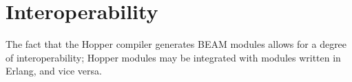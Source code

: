 \section{Interoperability}

The fact that the Hopper compiler generates BEAM modules allows for a degree of interoperability; Hopper modules may be integrated with modules written in Erlang, and vice versa. 